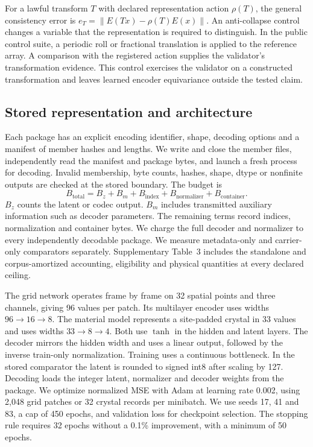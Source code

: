 \documentclass[10pt,a4paper,twocolumn]{article}
\begin{document}
For a lawful transform $T$ with declared representation action $\rho(T)$, the general consistency error is $e_T=\|E(Tx)-\rho(T)E(x)\|$. An anti-collapse control changes a variable that the representation is required to distinguish. In the public control suite, a periodic roll or fractional translation is applied to the reference array. A comparison with the registered action supplies the validator's transformation evidence. This control exercises the validator on a constructed transformation and leaves learned encoder equivariance outside the tested claim.

\subsection{Stored representation and architecture}
Each package has an explicit encoding identifier, shape, decoding options and a manifest of member hashes and lengths. We write and close the member files, independently read the manifest and package bytes, and launch a fresh process for decoding. Invalid membership, byte counts, hashes, shape, dtype or nonfinite outputs are checked at the stored boundary. The budget is
\begin{equation}
 B_{\mathrm{total}}=B_z+B_m+B_{\mathrm{index}}+
 B_{\mathrm{normalizer}}+B_{\mathrm{container}}.
\end{equation}
$B_z$ counts the latent or codec output. $B_m$ includes transmitted auxiliary information such as decoder parameters. The remaining terms record indices, normalization and container bytes. We charge the full decoder and normalizer to every independently decodable package. We measure metadata-only and carrier-only comparators separately. Supplementary Table~3 includes the standalone and corpus-amortized accounting, eligibility and physical quantities at every declared ceiling.

The grid network operates frame by frame on 32 spatial points and three channels, giving 96 values per patch. Its multilayer encoder uses widths $96\!\rightarrow\!16\!\rightarrow\!8$. The material model represents a site-padded crystal in 33 values and uses widths $33\!\rightarrow\!8\!\rightarrow\!4$. Both use $\tanh$ in the hidden and latent layers. The decoder mirrors the hidden width and uses a linear output, followed by the inverse train-only normalization. Training uses a continuous bottleneck. In the stored comparator the latent is rounded to signed int8 after scaling by 127. Decoding loads the integer latent, normalizer and decoder weights from the package. We optimize normalized MSE with Adam at learning rate 0.002, using 2,048 grid patches or 32 crystal records per minibatch. We use seeds 17, 41 and 83, a cap of 450 epochs, and validation loss for checkpoint selection. The stopping rule requires 32 epochs without a 0.1\% improvement, with a minimum of 50 epochs.
\end{document}
